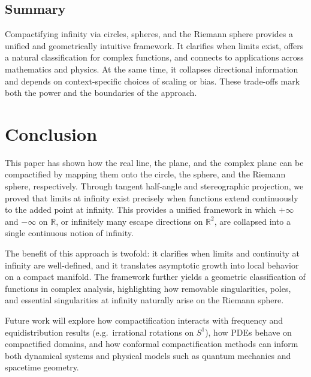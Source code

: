 \documentclass[12pt]{article}
\theoremstyle{remark}
\begin{document}
\subsection{Summary}
Compactifying infinity via circles, spheres, and the Riemann sphere provides a 
unified and geometrically intuitive framework. It clarifies when limits exist, 
offers a natural classification for complex functions, and connects to 
applications across mathematics and physics. At the same time, it collapses 
directional information and depends on context-specific choices of scaling or 
bias. These trade-offs mark both the power and the boundaries of the approach.

\section{Conclusion}

This paper has shown how the real line, the plane, and the complex plane can be 
compactified by mapping them onto the circle, the sphere, and the Riemann sphere, 
respectively. Through tangent half-angle and stereographic projection, we proved 
that limits at infinity exist precisely when functions extend continuously to the 
added point at infinity. This provides a unified framework in which $+\infty$ and 
$-\infty$ on $\mathbb{R}$, or infinitely many escape directions on $\mathbb{R}^2$, 
are collapsed into a single continuous notion of infinity.  

The benefit of this approach is twofold: it clarifies when limits and continuity 
at infinity are well-defined, and it translates asymptotic growth into local 
behavior on a compact manifold. The framework further yields a geometric 
classification of functions in complex analysis, highlighting how removable 
singularities, poles, and essential singularities at infinity naturally arise on 
the Riemann sphere.  

Future work will explore how compactification interacts with frequency and 
equidistribution results (e.g.\ irrational rotations on $S^1$), how PDEs behave 
on compactified domains, and how conformal compactification methods can inform 
both dynamical systems and physical models such as quantum mechanics and 
spacetime geometry.




\end{document}
